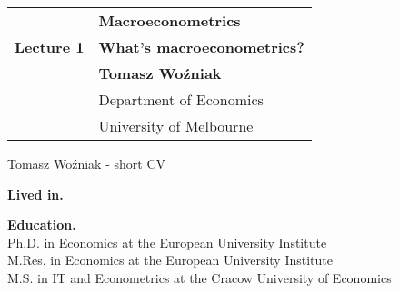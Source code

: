 \documentclass[notes,blackandwhite,mathsans]{beamer}
\begin{document}






{
\begin{frame}

\vspace{1cm}
\begin{tabular}{rl}
&\textbf{\LARGE\color{mcxs1} Macroeconometrics}\\[6ex]
\textbf{\color{mcxs3}\Large Lecture 1}&\textbf{\Large\color{mcxs5}What's macroeconometrics?}\\[19ex]
&\textbf{\color{mcxs1} Tomasz Wo\'zniak}\\[1ex]
&{\small\color{mcxs5} Department of Economics}\\
&{\small\color{mcxs5}University of Melbourne}
\end{tabular}

\end{frame}
}






\begin{frame}{Tomasz Wo\'zniak - short CV}

\textbf{Lived in.}\\

\vspace{1cm}\textbf{Education.}\\
{\small {\color{mcxs3}Ph.D. in} {\color{mcxs2} Economics} {\color{mcxs3} at the }European University Institute\\
{\color{mcxs3}M.Res. in Economics at the }European University Institute \\
{\color{mcxs3}M.S. in }IT and Econometrics {\color{mcxs3} at the} {\color{mcxs2} Cracow University of Economics} \\}


\end{frame}
\end{document}
